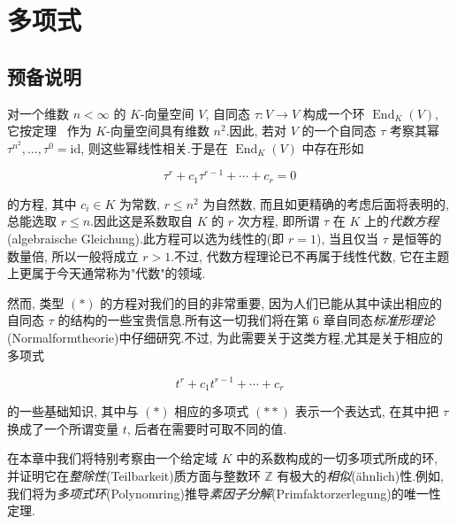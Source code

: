 \chapter{多项式}

\section*{预备说明}

对一个维数 $n < \infty$ 的 $K$-向量空间 $V$, 自同态 $\tau \colon V \longrightarrow V$ 构成一个环 $\operatorname{End}_K(V)$, 它按定理~ 作为 $K$-向量空间具有维数 $n^2$.因此, 若对 $V$ 的一个自同态 $\tau$ 考察其幂 $\tau^{n^2}, \ldots, \tau^0 = \mathrm{id}$, 则这些幂线性相关.于是在 $\operatorname{End}_K(V)$ 中存在形如

\begin{equation}
\tau^{r} + c_{1}\tau^{r-1} + \cdots + c_{r} = 0 \tag{$(*)$}
\end{equation}

的方程, 其中 $c_i \in K$ 为常数, $r \leq n^2$ 为自然数, 而且如更精确的考虑后面将表明的, 总能选取 $r \leq n$.因此这是系数取自 $K$ 的 $r$ 次方程, 即所谓 $\tau$ 在 $K$ 上的\emph{代数方程}(\textup{algebraische Gleichung}).此方程可以选为线性的(即 $r = 1$), 当且仅当 $\tau$ 是恒等的数量倍, 所以一般将成立 $r > 1$.不过, 代数方程理论已不再属于线性代数, 它在主题上更属于今天通常称为"代数"的领域.

然而, 类型 $(*)$ 的方程对我们的目的非常重要, 因为人们已能从其中读出相应的自同态 $\tau$ 的结构的一些宝贵信息.所有这一切我们将在第 6 章自同态\emph{标准形理论}(\textup{Normalformtheorie})中仔细研究.不过, 为此需要关于这类方程,尤其是关于相应的多项式

\begin{equation}
t^{r} + c_{1}t^{r-1} + \cdots + c_{r} \tag{($**$)}
\end{equation}

的一些基础知识, 其中与 $(*)$ 相应的多项式 $(**)$ 表示一个表达式, 在其中把 $\tau$ 换成了一个所谓变量 $t$, 后者在需要时可取不同的值.

在本章中我们将特别考察由一个给定域 $K$ 中的系数构成的一切多项式所成的环, 并证明它在\emph{整除性}(\textup{Teilbarkeit})质方面与整数环 $\mathbb{Z}$ 有极大的\emph{相似}(\textup{ähnlich})性.例如, 我们将为\emph{多项式环}(\textup{Polynomring})推导\emph{素因子分解}(\textup{Primfaktorzerlegung})的唯一性定理.

